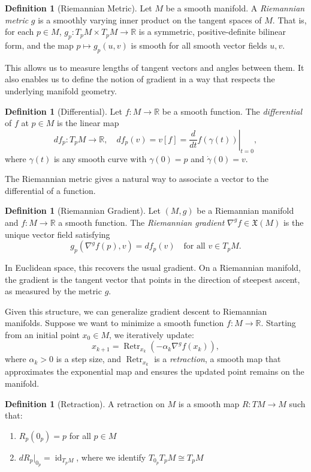 \documentclass{article}
\theoremstyle{plain}
\theoremstyle{definition}
\newtheorem{definition}[theorem]{Definition}
\theoremstyle{remark}
\DeclareMathOperator{\id}{id}
\begin{document}
\begin{definition}[Riemannian Metric]
Let $M$ be a smooth manifold. A \emph{Riemannian metric} $g$ is a smoothly varying inner product on the tangent spaces of $M$. That is, for each $p \in M$, $g_p: T_p M \times T_p M \to \mathbb{R}$ is a symmetric, positive-definite bilinear form, and the map $p \mapsto g_p(u, v)$ is smooth for all smooth vector fields $u, v$.
\end{definition}

This allows us to measure lengths of tangent vectors and angles between them. It also enables us to define the notion of gradient in a way that respects the underlying manifold geometry.

\begin{definition}[Differential]
Let $f: M \to \mathbb{R}$ be a smooth function. The \emph{differential} of $f$ at $p \in M$ is the linear map
\[
df_p: T_p M \to \mathbb{R}, \quad df_p(v) = v[f] = \left.\frac{d}{dt} f(\gamma(t))\right|_{t=0},
\]
where $\gamma(t)$ is any smooth curve with $\gamma(0) = p$ and $\dot{\gamma}(0) = v$.
\end{definition}

The Riemannian metric gives a natural way to associate a vector to the differential of a function.

\begin{definition}[Riemannian Gradient]
Let $(M, g)$ be a Riemannian manifold and $f: M \to \mathbb{R}$ a smooth function. The \emph{Riemannian gradient} $\nabla^g f \in \mathfrak{X}(M)$ is the unique vector field satisfying
\[
g_p(\nabla^g f(p), v) = df_p(v) \quad \text{for all } v \in T_p M.
\]
\end{definition}

In Euclidean space, this recovers the usual gradient. On a Riemannian manifold, the gradient is the tangent vector that points in the direction of steepest ascent, as measured by the metric $g$.

Given this structure, we can generalize gradient descent to Riemannian manifolds. Suppose we want to minimize a smooth function $f: M \to \mathbb{R}$. Starting from an initial point $x_0 \in M$, we iteratively update:
\[
x_{k+1} = \operatorname{Retr}_{x_k}\left(-\alpha_k \nabla^g f(x_k)\right),
\]
where $\alpha_k > 0$ is a step size, and $\operatorname{Retr}_{x_k}$ is a \emph{retraction}, a smooth map that approximates the exponential map and ensures the updated point remains on the manifold.

\begin{definition}[Retraction]
A retraction on $M$ is a smooth map $R: TM \to M$ such that:
\begin{enumerate}
\item $R_p(0_p) = p$ for all $p \in M$
\item $dR_p|_{0_p} = \id_{T_p M}$, where we identify $T_{0_p}T_p M \cong T_p M$
\end{enumerate}
\end{definition}
\end{document}
